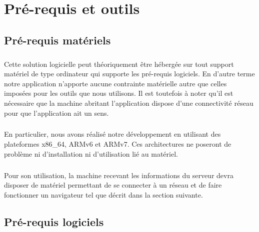 \chapter{Pré-requis et outils}

\section{Pré-requis matériels}
    \paragraph{}
        Cette solution logicielle peut théoriquement être hébergée sur tout
        support matériel de type ordinateur qui supporte les pré-requis
        logiciels.
        En d'autre terme notre application n'apporte aucune contrainte
        matérielle autre que celles imposées pour les outils que nous
        utilisons.
        Il est toutefois à noter qu'il est nécessaire que la machine abritant
        l'application dispose d'une connectivité réseau pour que l'application
        ait un sens.
    \paragraph{}
        En particulier, nous avons réalisé notre développement en utilisant des plateformes x86\_64, ARMv6 et ARMv7. Ces architectures ne poseront de problème ni d'installation ni d'utilisation lié au matériel.

    \paragraph{}
        Pour son utilisation, la machine recevant les informations du serveur
        devra disposer de matériel permettant de se connecter à un réseau et
        de faire fonctionner un navigateur tel que décrit dans la section
        suivante.

\section{Pré-requis logiciels}

